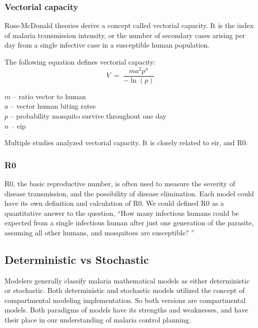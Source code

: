 \documentclass[a4paper, 12pt, twoside]{report}
\begin{document}
\subsubsection{Vectorial capacity}
\label{par:interpretation_of_vectorial_capacity_equation}
Ross-McDonald theories derive a concept called vectorial capacity.
It is the index of malaria transmission intensity, or the number of secondary cases arising per day from a single infective case in a susceptible human population.

The following equation defines vectorial capacity:
\begin{equation}
	V\ =\ \frac{ma^2p^n}{-\ln{\left(p\right)}}
\end{equation}

\begin{centering}
	$m$ – ratio vector to human\\
	$a$ – vector human biting rates\\
	$p$	– probability mosquito survive throughout one day\\
	$n$	–	\gls{eip}
\end{centering}

Multiple studies\cite{LeMenach2007a,Bomblies2009b,Briet2019,AnjuViswan2019,Molineaux1978,Gerardin2017,Bomblies2014,Weaver2010a} analyzed vectorial capacity.
It is closely related to \gls{eir}, and \gls{R0}.

\subsubsection{\texorpdfstring{\gls{R0}}{R0}}%
\label{par:R0}
\gls{R0}, the basic reproductive number, is often used to measure the severity of disease transmission, and the possibility of disease elimination.
Each model could have its own definition and calculation of \gls{R0}.
We could defined \gls{R0} as a quantitative answer to the question, “How many infectious humans could be expected from a single infectious human after just one generation of the parasite, assuming all other humans, and mosquitoes are susceptible? ”

\subsection{Deterministic vs Stochastic}
\label{subsubsec:deterministic_vs_stochastic}

Modelers generally classify malaria mathematical models as either deterministic or stochastic.
Both deterministic and stochastic models utilized the concept of compartmental modeling implementation.
So both versions are compartmental models.
Both paradigms of models have its strengths and weaknesses, and have their place in our understanding of malaria control planning.
\end{document}
